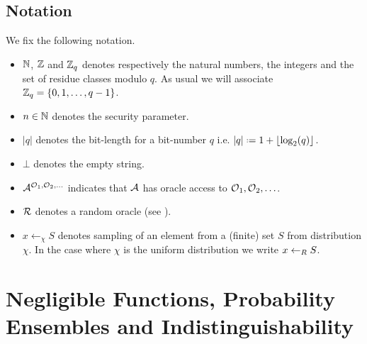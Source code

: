 \begin{comment}
	\item In definitions we are often sampling bit-strings, while in concrete constructions, we sample from e.g. a finite group. We assume this makes no difference and that an efficient encoding exists between a set of bit-strings and the finite group. \fxnote{Maybe remove}
\end{comment}

\subsection{Notation}

We fix the following notation. 
\begin{itemize}
	\itemsep-0.1em
	\item $\mathbb{N}$, $\mathbb{Z}$ and $\mathbb{Z}_q$ denotes respectively the natural numbers, the integers and the set of residue classes modulo $q$. As usual we will associate $\mathbb{Z}_q=\{0,1,\ldots,q-1\}$. 
	\item $n\in\mathbb{N}$ denotes the security parameter.
	\item $\vert q\vert$ denotes the bit-length for a bit-number $q$ i.e. $\vert q\vert \defeq 1 + \lfloor \log_2(q)\rfloor$.
	\item $\bot$ denotes the empty string.
	\item $\mathcal{A}^{\operatorname{\mathcal{O}}_1,\operatorname{\mathcal{O}}_2,\ldots}$ indicates that $\mathcal{A}$ has oracle access to $\operatorname{\mathcal{O}}_1,\operatorname{\mathcal{O}}_2,\ldots$. 
	\item $\operatorname{\mathcal{R}}$ denotes a random oracle (see ).
	\item $x\leftarrow_{\chi} S$ denotes sampling of an element from a (finite) set $S$ from distribution $\chi$. In the case where $\chi$ is the uniform distribution we write $x\leftarrow_R S$. 
\end{itemize}

\begin{comment}
	\item $\dev$ denotes a cryptographic device.
	\item $\param$ denotes a parameters function.
	\item $\pred$ denotes a predicate function.
	\item $\cgame$ represents a cryptographic game.
	\item $\bb$ represents a big brother.
\end{comment}

\section{Negligible Functions, Probability Ensembles and Indistinguishability} 

